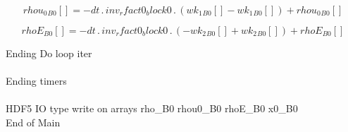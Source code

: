 \documentclass{article}
\begin{document}
\begin{dmath}{rhou_{0}{_{B0}}}[{}] = - dt \,.\, inv_rfact0_block0 \,.\, \left({wk_{1}{_{B0}}}[{}] - {wk_{1}{_{B0}}}[{}]\right) + {rhou_{0}{_{B0}}}[{}]\end{dmath}

\begin{dmath}{rhoE{_{B0}}}[{}] = - dt \,.\, inv_rfact0_block0 \,.\, \left(- {wk_{2}{_{B0}}}[{}] + {wk_{2}{_{B0}}}[{}]\right) + {rhoE{_{B0}}}[{}]\end{dmath}

\noindent Ending Do loop iter\\
\\\noindent Ending timers\\
\\\noindent HDF5 IO type write on arrays rho_B0 rhou0_B0 rhoE_B0 x0_B0\\\noindent End of Main\\
\end{document}
